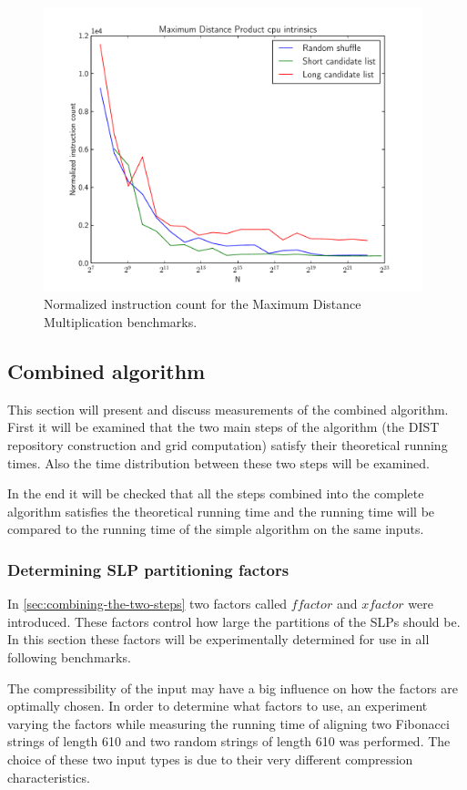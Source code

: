 \documentclass[twoside,11pt,openright]{report}
\newcommand{\xfactor}{\ensuremath{\mathit{xfactor}}}
\newcommand{\ffactor}{\ensuremath{\mathit{ffactor}}}
\begin{document}
\begin{figure}[!htb]
  \centering
  \includegraphics[width=11cm]{distance-mult/max-dist-mult-cpu}
  \caption{Normalized instruction count for the Maximum Distance Multiplication benchmarks.}
  \label{fig:benchmark:max-distance-cpu}
\end{figure}

\clearpage
\subsection{Combined algorithm}
This section will present and discuss measurements of the combined algorithm. First it will be examined that the two main steps of the algorithm (the DIST repository construction and grid computation) satisfy their theoretical running times. Also the time distribution between these two steps will be examined.

In the end it will be checked that all the steps combined into the complete algorithm satisfies the theoretical running time and the running time will be compared to the running time of the simple algorithm on the same inputs.

\subsubsection{Determining SLP partitioning factors}
\label{sec:benchmark:slp-partition-factors}
In \cref{sec:combining-the-two-steps} two factors called $\ffactor$ and $\xfactor$ were introduced. These factors control how large the partitions of the SLPs should be. In this section these factors will be experimentally determined for use in all following benchmarks.

The compressibility of the input may have a big influence on how the factors are optimally chosen. In order to determine what factors to use, an experiment varying the factors while measuring the running time of aligning two Fibonacci strings of length 610 and two random strings of length 610 was performed. The choice of these two input types is due to their very different compression characteristics.
\end{document}
